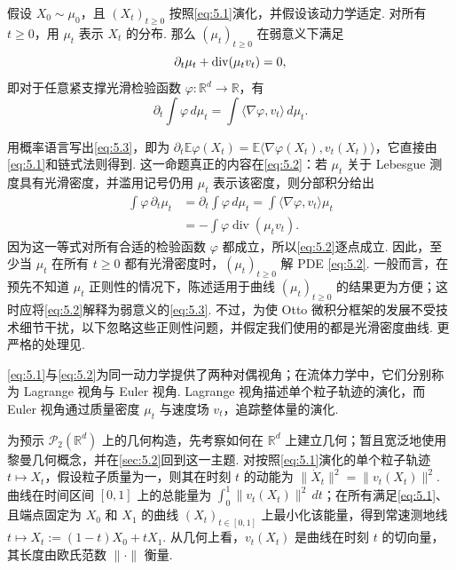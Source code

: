 \begin{proposition}[连续性方程]\label{prop:5.1}
假设 $X_0\sim\mu_0$，且 $(X_t)_{t\geq0}$ 按照\eqref{eq:5.1}演化，并假设该动力学适定. 对所有 $t\geq0$，用 $\mu_t$ 表示 $X_t$ 的分布. 那么 $(\mu_t)_{t\geq0}$ 在弱意义下满足
\begin{equation}\label{eq:5.2}\index{continuity equation@连续性方程（continuity equation）|hyperpage}
\partial_t\mu_t+\operatorname{div}(\mu_tv_t)=0,
\end{equation}
即对于任意紧支撑光滑检验函数 $\varphi:\mathbb R^d\to\mathbb R$，有
\begin{equation}\label{eq:5.3}
\partial_t\int\varphi\,d\mu_t=\int\langle\nabla\varphi,v_t\rangle\,d\mu_t.
\end{equation}
\end{proposition}

用概率语言写出\eqref{eq:5.3}，即为 $\partial_t\mathbb E\varphi(X_t)=\mathbb E\langle\nabla\varphi(X_t),v_t(X_t)\rangle$，它直接由\eqref{eq:5.1}和链式法则得到. 这一命题真正的内容在\eqref{eq:5.2}：若 $\mu_t$ 关于 Lebesgue 测度具有光滑密度，并滥用记号仍用 $\mu_t$ 表示该密度，则分部积分给出
$$
\begin{aligned}
\int\varphi\,\partial_t\mu_t
&=\partial_t\int\varphi\,d\mu_t
=\int\langle\nabla\varphi,v_t\rangle\mu_t\\
&=-\int\varphi\operatorname{div}(\mu_tv_t).
\end{aligned}
$$
因为这一等式对所有合适的检验函数 $\varphi$ 都成立，所以\eqref{eq:5.2}逐点成立. 因此，至少当 $\mu_t$ 在所有 $t\geq0$ 都有光滑密度时，$(\mu_t)_{t\geq0}$ 解 PDE \eqref{eq:5.2}. 一般而言，在预先不知道 $\mu_t$ 正则性的情况下，陈述适用于曲线 $(\mu_t)_{t\geq0}$ 的结果更为方便；这时应将\eqref{eq:5.2}解释为弱意义的\eqref{eq:5.3}. 不过，为使 Otto 微积分框架的发展不受技术细节干扰，以下忽略这些正则性问题，并假定我们使用的都是光滑密度曲线. 更严格的处理见\cite{ref18}.

\eqref{eq:5.1}与\eqref{eq:5.2}为同一动力学提供了两种对偶视角；在流体力学中，它们分别称为 Lagrange 视角与 Euler 视角. Lagrange 视角描述单个粒子轨迹的演化，而 Euler 视角通过质量密度 $\mu_t$ 与速度场 $v_t$，追踪整体量的演化.

为预示 $\mathcal P_2(\mathbb R^d)$ 上的几何构造，先考察如何在 $\mathbb R^d$ 上建立几何；暂且宽泛地使用黎曼几何概念，并在\autoref{sec:5.2}回到这一主题. 对按照\eqref{eq:5.1}演化的单个粒子轨迹 $t\mapsto X_t$，假设粒子质量为一，则其在时刻 $t$ 的动能为 $\|\dot X_t\|^2=\|v_t(X_t)\|^2$. 曲线在时间区间 $[0,1]$ 上的总能量为 $\int_0^1\|v_t(X_t)\|^2\,dt$；在所有满足\eqref{eq:5.1}、且端点固定为 $X_0$ 和 $X_1$ 的曲线 $(X_t)_{t\in[0,1]}$ 上最小化该能量，得到常速测地线 $t\mapsto X_t:=(1-t)X_0+tX_1$. 从几何上看，$v_t(X_t)$ 是曲线在时刻 $t$ 的切向量，其长度由欧氏范数 $\|\cdot\|$ 衡量.

